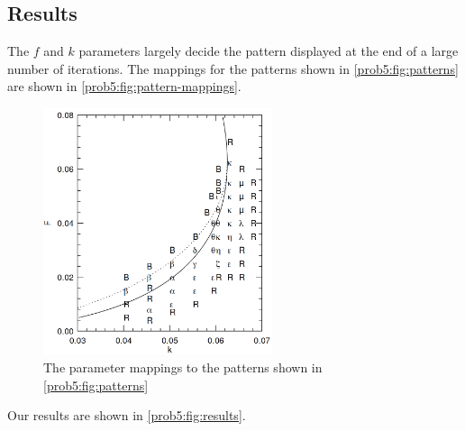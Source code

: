 \subsection{Results}
The $f$ and $k$ parameters largely decide the pattern displayed at the end of a large number of iterations.
The mappings for the patterns shown in \autoref{prob5:fig:patterns} are shown in \autoref{prob5:fig:pattern-mappings}.
\begin{figure}[H]
    \centering
    \includegraphics[width=0.6\textwidth]{figures/reactions/pattern-mappings.png}
    \caption{The parameter mappings to the patterns shown in \autoref{prob5:fig:patterns}}\label{prob5:fig:pattern-mappings}
\end{figure}

Our results are shown in \autoref{prob5:fig:results}.

